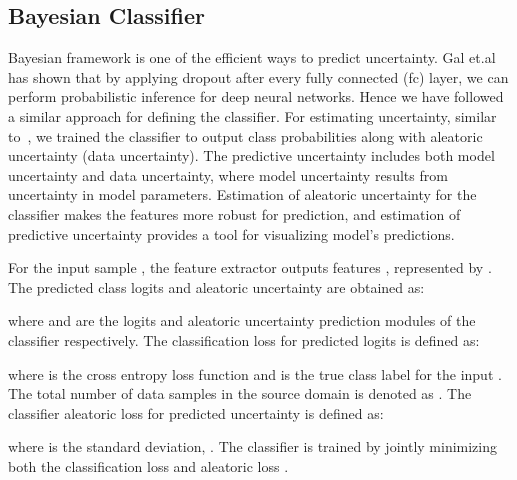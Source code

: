 \documentclass[10pt,twocolumn,letterpaper]{article}
\begin{document}
\subsection{Bayesian Classifier}
Bayesian framework is one of the efficient ways to predict uncertainty. Gal et.al~\cite{Gal2016Uncertainty} has shown that by applying dropout after every fully connected (fc) layer, we can perform probabilistic inference for deep neural networks. Hence we have followed a similar approach for defining the classifier.
For estimating uncertainty, similar to~\cite{kendall2017uncertainties,WinNT}, we trained the classifier to output class probabilities along with aleatoric uncertainty (data uncertainty). The predictive uncertainty includes both model uncertainty and data uncertainty, where model uncertainty results from uncertainty in model parameters. Estimation of aleatoric uncertainty for the classifier makes the features more robust for prediction, and estimation of predictive uncertainty provides a tool for visualizing model's predictions. 

For the input sample , the feature extractor  outputs features , represented by . The predicted class logits  and aleatoric uncertainty  are obtained as:

 
where    and  are the logits and aleatoric uncertainty prediction modules of the classifier  respectively.
The classification loss for predicted logits is defined as: 

where  is the cross entropy loss function and   is the true class label for the input . The total number of data samples in the source domain is denoted as . The classifier aleatoric loss  for predicted uncertainty  is defined as:

 where  is the standard deviation, . The classifier is trained by jointly minimizing both the classification loss  and  aleatoric loss .
\end{document}
